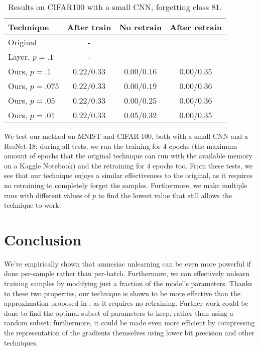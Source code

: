 \documentclass{article}
\begin{document}
\begin{table}
    \centering
    \caption{Results on CIFAR100 with a small CNN, forgetting class $81$.}
    \label{tab:cifar_small_cnn}
    \begin{tabular}{l | c | c c}
        Technique&After train&No retrain&After retrain\\
        \hline
        Original&-\\
        Layer, $p=.1$&-\\
        \hline
        Ours, $p=.1$&$0.22$/$0.33$&$0.00$/$0.16$&$0.00$/$0.35$\\
        Ours, $p=.075$&$0.22$/$0.33$&$0.00$/$0.19$&$0.00$/$0.36$\\
        Ours, $p=.05$&$0.22$/$0.33$&$0.00$/$0.25$&$0.00$/$0.36$\\
        Ours, $p=.01$&$0.22$/$0.33$&$0.05$/$0.32$&$0.00$/$0.35$\\
    \end{tabular}
    \end{table}

We test our method on MNIST and CIFAR-100, both with a small CNN and a ResNet-18; during all tests, we run the training for $4$ epochs (the maximum amount of epochs that the original technique can run with the available memory on a Kaggle Notebook) and the retraining for $4$ epochs too. From these tests, we see that our technique enjoys a similar effectiveness to the original, as it requires no retraining to completely forget the samples. Furthermore, we make multiple runs with different values of $p$ to find the lowest value that still allows the technique to work.

\section{Conclusion}
We've empirically shown that amnesiac unlearning can be even more powerful if done per-sample rather than per-batch. Furthermore, we can effectively unlearn training samples by modifying just a fraction of the model's parameters. Thanks to these two properties, our technique is shown to be more effective than the approximation proposed in \cite{gogineni2024efficient}, as it requires no retraining. Further work could be done to find the optimal subset of parameters to keep, rather than using a random subset; furthermore, it could be made even more efficient by compressing the representation of the gradients themselves using lower bit precision and other techniques.



\end{document}
